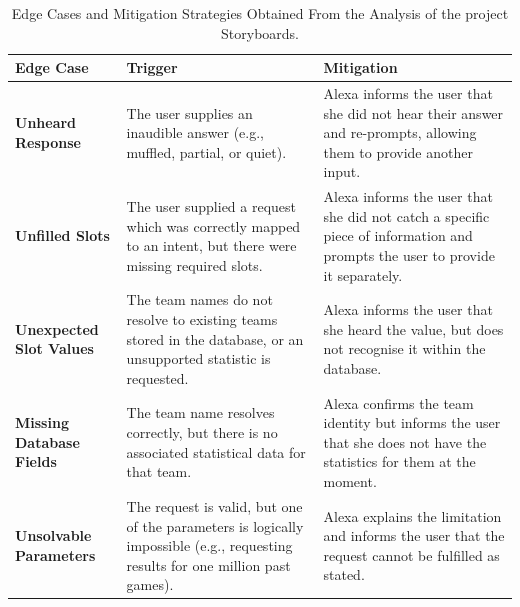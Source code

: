 \begin{table}[H]
    \centering
    \small
    \begin{tabularx}{\linewidth}{@{} l >{\raggedright\arraybackslash}X >{\raggedright\arraybackslash}X @{}}
        \toprule
        \textbf{Edge Case} & \textbf{Trigger} & \textbf{Mitigation} \\ 
        \midrule
        
        \textbf{Unheard Response} & 
        The user supplies an inaudible answer (e.g., muffled, partial, or quiet). & 
        Alexa informs the user that she did not hear their answer and re-prompts, allowing them to provide another input. \\
        \addlinespace
        
        \midrule
        \textbf{Unfilled Slots} & 
        The user supplied a request which was correctly mapped to an intent, but there were missing required slots. & 
        Alexa informs the user that she did not catch a specific piece of information and prompts the user to provide it separately. \\
        \addlinespace
        
        \midrule
        \textbf{Unexpected Slot Values} & 
        The team names do not resolve to existing teams stored in the database, or an unsupported statistic is requested. & 
        Alexa informs the user that she heard the value, but does not recognise it within the database. \\
        \addlinespace
        
        \midrule
        \textbf{Missing Database Fields} & 
        The team name resolves correctly, but there is no associated statistical data for that team. & 
        Alexa confirms the team identity but informs the user that she does not have the statistics for them at the moment. \\
        \addlinespace
        
        \midrule
        \textbf{Unsolvable Parameters} & 
        The request is valid, but one of the parameters is logically impossible (e.g., requesting results for one million past games). & 
        Alexa explains the limitation and informs the user that the request cannot be fulfilled as stated. \\
        \bottomrule
    \end{tabularx}
    \caption{Edge Cases and Mitigation Strategies Obtained From the Analysis of the project Storyboards.}
    \label{tab:EdgeCaseHandling}
\end{table}

